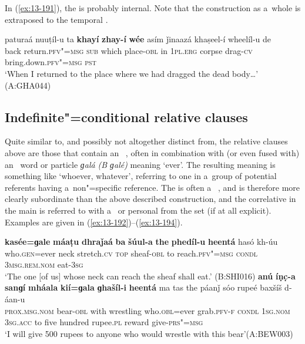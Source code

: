 In (\ref{ex:13-191}), the  is probably internal. Note that the construction as a~whole is extraposed to the temporal .

\ea
\label{ex:13-191}
\gll paturaá nuuṭíl-u ta \textbf{khayí} \textbf{zhay-í} \textbf{wée} asím  ǰinaazá khaṣeel-í wheelíl-u de \\
back return.\textsc{pfv"=msg} \textsc{sub} which place-\textsc{obl} in \textsc{1pl.erg} corpse drag-\textsc{cv}  bring.down.\textsc{pfv"=msg} \textsc{pst}   \\
\glt `When I returned to the place where we had dragged the dead body{\ldots}' (A:GHA044)
\z

\subsection{Indefinite"=conditional relative clauses}
\label{subsec:13-6-2}

Quite similar to, and possibly not altogether distinct from, the relative clauses above are those that contain an~ , often in combination with (or even fused with) an~ word or particle \textit{ɡalá} \textit{(B ɡalé)} meaning `ever'. The resulting meaning is something like `whoever, whatever', referring to one in a~group of potential referents having a~non"=specific reference. The  is often a~ , and is therefore more clearly subordinate than the above described construction, and the correlative in the main  is referred to with a~ or personal  from the  set (if at all explicit). Examples are given in (\ref{ex:13-192})--(\ref{ex:13-194}).
\largerpage

\ea
\label{ex:13-192}
\gll \textbf{kasée=ɡale} \textbf{máaṭu} \textbf{dhraǰaá} \textbf{ba} \textbf{šúul-a} \textbf{the} \textbf{phedíl-u} \textbf{heentá} hasó kh-úu\\
who.\textsc{gen}=ever neck stretch.\textsc{cv} \textsc{top} sheaf-\textsc{obl} to  reach.\textsc{pfv"=msg} \textsc{condl} \textsc{3msg.rem.nom} eat-\textsc{3sg}\\
\glt `The one [of us] whose neck can reach the sheaf shall eat.' (B:SHI016)
\ex
\label{ex:13-193}
\gll \textbf{anú} \textbf{íṇc̣-a} \textbf{sanɡí} \textbf{mháala} \textbf{kií=ɡala} \textbf{ɡhašíl-i}  \textbf{heentá} ma tas the páanǰ sóo rupeé baxšíš d-áan-u\\
\textsc{prox.msg.nom}{\protect\footnotemark} bear-\textsc{obl} with wrestling who.\textsc{obl}=ever grab.\textsc{pfv-f} \textsc{condl} \textsc{1sg.nom} \textsc{3sg.acc} to five hundred rupee.\textsc{pl} reward give-\textsc{prs"=msg}\\
\glt `I will give 500 rupees to anyone who would wrestle with this bear'\newline (A:BEW003)

